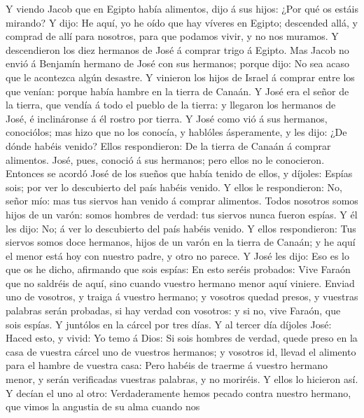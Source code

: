  Y viendo Jacob que en Egipto había alimentos, dijo á sus
hijos: ¿Por qué os estáis mirando?  Y dijo: He aquí, yo he
oído que hay víveres en Egipto; descended allá, y comprad de allí para
nosotros, para que podamos vivir, y no nos muramos.  Y
descendieron los diez hermanos de José á comprar trigo á Egipto.
 Mas Jacob no envió á Benjamín hermano de José con sus
hermanos; porque dijo: No sea acaso que le acontezca algún desastre.
 Y vinieron los hijos de Israel á comprar entre los que
venían: porque había hambre en la tierra de Canaán.  Y José
era el señor de la tierra, que vendía á todo el pueblo de la tierra: y
llegaron los hermanos de José, é inclináronse á él rostro por tierra.
 Y José como vió á sus hermanos, conociólos; mas hizo que no
los conocía, y hablóles ásperamente, y les dijo: ¿De dónde habéis
venido? Ellos respondieron: De la tierra de Canaán á comprar alimentos.
 José, pues, conoció á sus hermanos; pero ellos no le
conocieron.  Entonces se acordó José de los sueños que había
tenido de ellos, y díjoles: Espías sois; por ver lo descubierto del país
habéis venido.  Y ellos le respondieron: No, señor mío: mas
tus siervos han venido á comprar alimentos.  Todos nosotros
somos hijos de un varón: somos hombres de verdad: tus siervos nunca
fueron espías.  Y él les dijo: No; á ver lo descubierto del
país habéis venido.  Y ellos respondieron: Tus siervos
somos doce hermanos, hijos de un varón en la tierra de Canaán; y he aquí
el menor está hoy con nuestro padre, y otro no parece.  Y
José les dijo: Eso es lo que os he dicho, afirmando que sois espías:
 En esto seréis probados: Vive Faraón que no saldréis de
aquí, sino cuando vuestro hermano menor aquí viniere. 
Enviad uno de vosotros, y traiga á vuestro hermano; y vosotros quedad
presos, y vuestras palabras serán probadas, si hay verdad con vosotros:
y si no, vive Faraón, que sois espías.  Y juntólos en la
cárcel por tres días.  Y al tercer día díjoles José: Haced
esto, y vivid: Yo temo á Dios:  Si sois hombres de verdad,
quede preso en la casa de vuestra cárcel uno de vuestros hermanos; y
vosotros id, llevad el alimento para el hambre de vuestra casa:
 Pero habéis de traerme á vuestro hermano menor, y serán
verificadas vuestras palabras, y no moriréis. Y ellos lo hicieron así.
 Y decían el uno al otro: Verdaderamente hemos pecado
contra nuestro hermano, que vimos la angustia de su alma cuando nos
